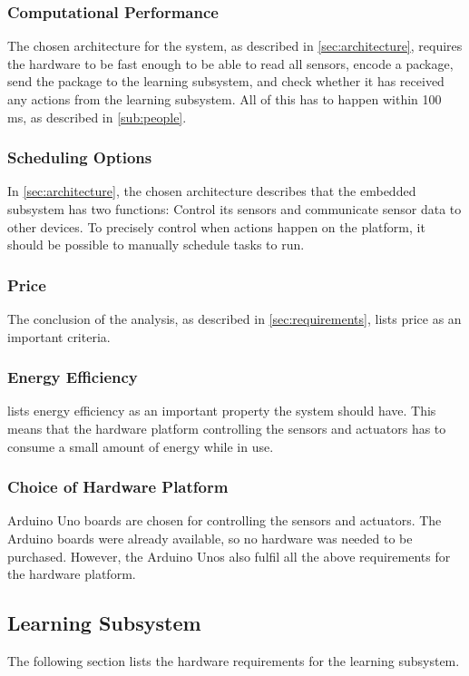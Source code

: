 \subsubsection{Computational Performance}
The chosen architecture for the system, as described in \cref{sec:architecture}, requires the hardware to be fast enough to be able to read all sensors, encode a package, send the package to the learning subsystem, and check whether it has received any actions from the learning subsystem. All of this has to happen within 100 ms, as described in \cref{sub:people}.

\subsubsection{Scheduling Options}
In \cref{sec:architecture}, the chosen architecture describes that the embedded subsystem has two functions: Control its sensors and communicate sensor data to other devices. To precisely control when actions happen on the platform, it should be possible to manually schedule tasks to run.

\subsubsection{Price}
The conclusion of the analysis, as described in \cref{sec:requirements}, lists price as an important criteria.

\subsubsection{Energy Efficiency}
 lists energy efficiency as an important property the system should have. This means that the hardware platform controlling the sensors and actuators has to consume a small amount of energy while in use.

\subsubsection{Choice of Hardware Platform}
Arduino Uno boards are chosen for controlling the sensors and actuators. The Arduino boards were already available, so no hardware was needed to be purchased. However, the Arduino Unos also fulfil all the above requirements for the hardware platform.

\subsection{Learning Subsystem}
The following section lists the hardware requirements for the learning subsystem.

